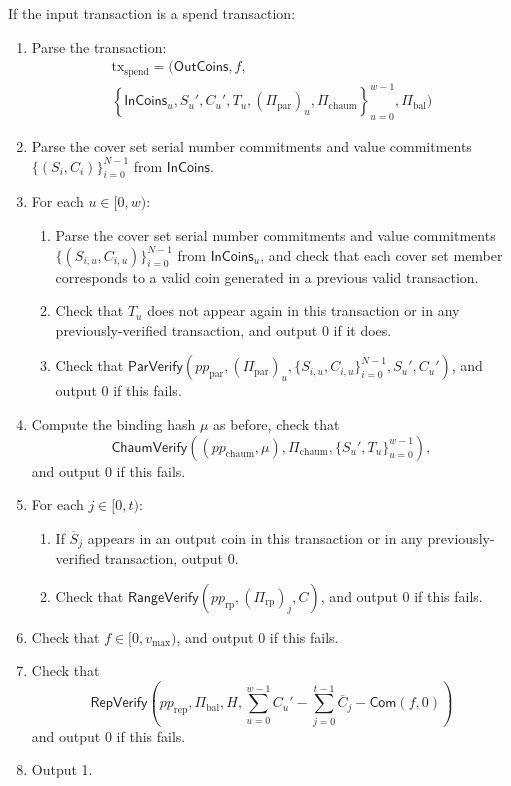 \documentclass{llncs}
\newcommand{\func}[1]{\mathsf{#1}}
\newcommand{\com}{\func{Com}}
\begin{document}
If the input transaction is a spend transaction:
\begin{enumerate}
    \item Parse the transaction:
    \begin{multline*}
    \text{tx}_{\text{spend}} = ( \func{OutCoins}, f, \\
    \left\{ \func{InCoins}_u, S_u', C_u', T_u, (\Pi_{\text{par}})_u, \Pi_{\text{chaum}} \right\}_{u=0}^{w-1}, \Pi_{\text{bal}} )
    \end{multline*}
    \item Parse the cover set serial number commitments and value commitments $\{(S_i, C_i)\}_{i=0}^{N-1}$ from $\func{InCoins}$.
    \item For each $u \in [0,w)$:
    \begin{enumerate}
        \item Parse the cover set serial number commitments and value commitments $\{(S_{i,u}, C_{i,u})\}_{i=0}^{N-1}$ from $\func{InCoins}_u$, and check that each cover set member corresponds to a valid coin generated in a previous valid transaction.
        \item Check that $T_u$ does not appear again in this transaction or in any previously-verified transaction, and output 0 if it does.
        \item Check that $\func{ParVerify}(pp_{\text{par}},(\Pi_{\text{par}})_u,\{S_{i,u},C_{i,u}\}_{i=0}^{N-1},S_u',C_u')$, and output 0 if this fails.
    \end{enumerate}
    \item Compute the binding hash $\mu$ as before, check that $$\func{ChaumVerify}((pp_{\text{chaum}},\mu),\Pi_{\text{chaum}},\{S_u',T_u\}_{u=0}^{w-1}),$$ and output 0 if this fails.
    \item For each $j \in [0,t)$:
    \begin{enumerate}
        \item If $\overline{S}_j$ appears in an output coin in this transaction or in any previously-verified transaction, output 0.
        \item Check that $\func{RangeVerify}(pp_{\text{rp}},(\Pi_{\text{rp}})_j,C)$, and output 0 if this fails.
    \end{enumerate}
    \item Check that $f \in [0,v_{\text{max}})$, and output 0 if this fails.
    \item Check that $$\func{RepVerify}\left( pp_{\text{rep}}, \Pi_{\text{bal}}, H, \sum_{u=0}^{w-1} C_u' - \sum_{j=0}^{t-1} \overline{C}_j - \com(f,0) \right)$$ and output 0 if this fails.
    \item Output 1.
\end{enumerate}
\end{document}
